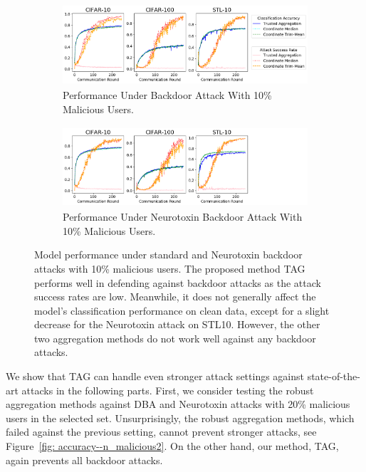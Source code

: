\documentclass{article} %
\begin{document}
\begin{figure}[htp]
\centering
  \begin{subfigure}{\textwidth}
  \centering
    \includegraphics[height=3cm, width=\textwidth]{make_article/make_visuals/visuals/accuracy--n_malicious1--dba0--beta0.2--d_scale.png}
    \caption{\footnotesize Performance Under Backdoor Attack With 10\% Malicious Users.}
  \end{subfigure}%

  \begin{subfigure}{\textwidth}
  \centering
    \includegraphics[height=3cm, width=\textwidth]{make_article/make_visuals/visuals/accuracy--n_malicious1--dba0--beta0.2--d_scale--neuro_p0.1_nolegend.png}
    \caption{\footnotesize Performance Under Neurotoxin Backdoor Attack With 10\% Malicious Users.}
  \end{subfigure}%
\caption{\footnotesize Model performance under standard and Neurotoxin backdoor attacks with 10\% malicious users. The proposed method TAG performs well in defending against backdoor attacks as the attack success rates are low. Meanwhile, it does not generally affect the model's classification performance on clean data, except for a slight decrease for the Neurotoxin attack on STL10. However, the other two aggregation methods do not work well against any backdoor attacks.} 
\label{fig: accuracy--n_malicious1}
\end{figure}

We show that TAG can handle even stronger attack settings against state-of-the-art attacks in the following parts. First, we consider testing the robust aggregation methods against DBA and Neurotoxin attacks with 20\% malicious users in the selected set. Unsurprisingly, the robust aggregation methods, which failed against the previous setting, cannot prevent stronger attacks, see Figure~\ref{fig: accuracy--n_malicious2}. On the other hand, our method, TAG, again prevents all backdoor attacks.
\end{document}
